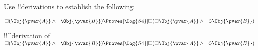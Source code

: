 \documentclass[../../../include/open-logic-section]{subfiles}
\begin{document}



\begin{prob}
    \citep[exercise 3.2 item 2]{MacFarlane-2020-PhilosophicalLogicContemporary}
    Use !!{derivation}s to establish the following:

    $\Box(\Obj{\pvar{A}}\land\lnot\Obj{\pvar{B}}) \Proves[\Log{S4}] 
    \Box(\Box\Obj{\pvar{A}}\land\lnot\Diamond\Obj{\pvar{B}})$ 

    \begin{ans}
    !!^{derivation} of $\Box(\Obj{\pvar{A}}\land\lnot\Obj{\pvar{B}}) \Proves[\Log{S4}] 
    \Box(\Box\Obj{\pvar{A}}\land\lnot\Diamond\Obj{\pvar{B}})$ 
    \begin{prooftree}
    \end{prooftree}


\end{ans}
\end{prob}
\end{document}
